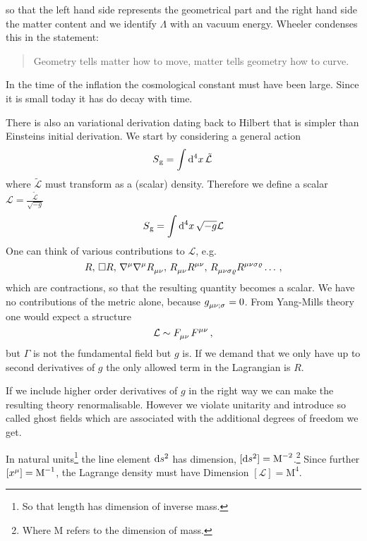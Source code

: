 so that the left hand side represents the geometrical part and the right hand
side the matter content and we identify $\Lambda$ with an vacuum energy.
Wheeler condenses this in the statement:
\begin{quote}
Geometry tells matter how to move, matter tells geometry how to
curve.
\end{quote}
\begin{sidenote}
In the time of the inflation the cosmological constant must have been large.
Since it is small today it has do decay with time.
\end{sidenote}
There is also an variational derivation dating back to Hilbert that is
simpler than Einsteins initial derivation. We start by considering a general action
\begin{equation}
S\textsubscript{g}=\fourint  \tilde{\mathcal{L}}\, 
\end{equation}
where $\tilde{\mathcal{L}}$ must transform as a (scalar) density. Therefore we
define a scalar $\mathcal{L}=\frac{\tilde{\mathcal{L}}}{\sqrt{-g}}$
\begin{equation}
S\textsubscript{g}=\fourint \sqrt{-g}\mathcal{L}
\end{equation}
One can think of various contributions to $\mathcal{L}$, e.g.
\begin{equation*}
R,\, \square
R,\,\tensor{\nabla}{^\mu}\tensor{\nabla}{^\mu}\tensor{R}{_\mu_\nu},\,
\tensor{R}{_\mu_\nu}\tensor{R}{^\mu^\nu}
,\,\tensor{R}{_\mu_\nu_\sigma_\varrho}\tensor{R}{^\mu^\nu^\sigma^\varrho}\dots\,,
\end{equation*}
which are contractions, so that the resulting quantity becomes a scalar.
We have no contributions of the metric alone, because
$\tensor{g}{_\mu_\nu_{;\sigma}}=0$. From Yang-Mills theory one would expect a
structure
\begin{equation}
\mathcal{L}\sim\tensor{F}{_\mu_\nu}\tensor{F}{^\mu^\nu}\,,
\end{equation}
but $\Gamma$ is not the fundamental field but $g$ is. If we demand that we only
have up to second derivatives of $g$ the only allowed term in the Lagrangian is
$R$.
\begin{sidenote}
If we include higher order derivatives of $g$ in the right way we can make the
resulting theory renormalisable. However we violate unitarity and introduce so
called ghost fields which are associated with the additional degrees of freedom
we get.
\end{sidenote}
\begin{remark}[Dimensions]
\pushftn
In natural units\footnote{So that length has dimension of inverse mass.} the
line element $\dif s^2$ has dimension, ${[\dif
s^2]=\textrm{M}^{-2}}$.\footnote{Where M refers to the dimension of mass.} 
Since further ${\left[\tensor{x}{^\mu}\right]=\textrm{M}^{-1}}$,
the Lagrange density must have Dimension
${\left[\mathcal{L}\right]=\textrm{M}^{4}}$.
\end{remark}%

